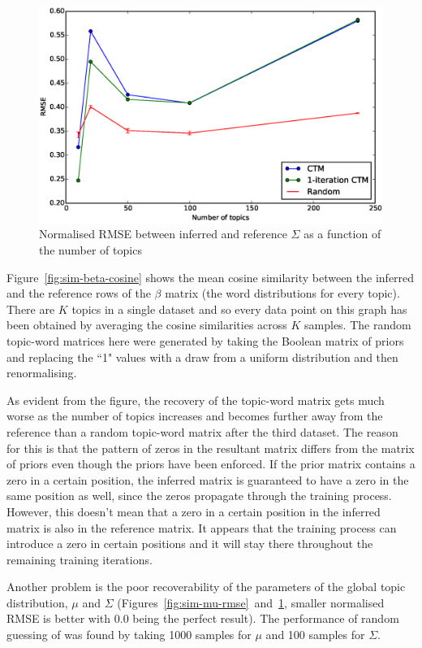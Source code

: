 \documentclass[12pt,a4paper,twoside,openright]{report}
\begin{document}
\begin{figure}[!htb]
\includegraphics[width=\textwidth]{sim-sigma-rmse.eps}
\caption{Normalised RMSE between inferred and reference $\Sigma$ as a function of the number of topics}
\label{fig:sim-sigma-rmse}
\end{figure}

Figure~\ref{fig:sim-beta-cosine} shows the mean cosine similarity between the inferred and the reference rows of the $\beta$ matrix (the word distributions for every topic). There are $K$ topics in a single dataset and so every data point on this graph has been obtained by averaging the cosine similarities across $K$ samples. The random topic-word matrices here were generated by taking the Boolean matrix of priors and replacing the ``1" values with a draw from a uniform distribution and then renormalising.

As evident from the figure, the recovery of the topic-word matrix gets much worse as the number of topics increases and becomes further away from the reference than a random topic-word matrix after the third dataset. The reason for this is that the pattern of zeros in the resultant matrix differs from the matrix of priors even though the priors have been enforced. If the prior matrix contains a zero in a certain position, the inferred matrix is guaranteed to have a zero in the same position as well, since the zeros propagate through the training process. However, this doesn't mean that a zero in a certain position in the inferred matrix is also in the reference matrix. It appears that the training process can introduce a zero in certain positions and it will stay there throughout the remaining training iterations.

Another problem is the poor recoverability of the parameters of the global topic distribution, $\mu$ and $\Sigma$ (Figures~\ref{fig:sim-mu-rmse}~and~\ref{fig:sim-sigma-rmse}, smaller normalised RMSE is better with 0.0 being the perfect result). The performance of random guessing of was found by taking 1000 samples for $\mu$ and 100 samples for $\Sigma$.
\end{document}
